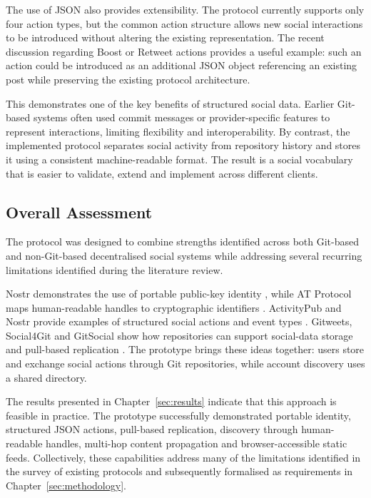 The use of JSON also provides extensibility. The protocol currently
supports only four action types, but the common action structure allows
new social interactions to be introduced without altering the existing
representation. The recent discussion regarding Boost or Retweet actions
provides a useful example: such an action could be introduced as an
additional JSON object referencing an existing post while preserving the
existing protocol architecture.

This demonstrates one of the key benefits of structured social data.
Earlier Git-based systems often used commit messages or
provider-specific features to represent interactions, limiting
flexibility and interoperability. By contrast, the implemented protocol
separates social activity from repository history and stores it using a
consistent machine-readable format. The result is a social vocabulary
that is easier to validate, extend and implement across different
clients.

\subsection{Overall Assessment}

The protocol was designed to combine strengths identified across both
Git-based and non-Git-based decentralised social systems while
addressing several recurring limitations identified during the
literature review.

Nostr demonstrates the use of portable public-key identity
\cite{fiatjaf2026}, while AT Protocol maps human-readable handles to
cryptographic identifiers \cite{atproto2026}. ActivityPub and Nostr
provide examples of structured social actions and event types
\cite{w3cActivityPub2018,fiatjaf2026}. Gitweets, Social4Git and GitSocial
show how repositories can support social-data storage and pull-based
replication \cite{gitweets2026,social4git2026,gitsocial2026}. The prototype
brings these ideas together: users store and exchange social actions
through Git repositories, while account discovery uses a shared directory.

The results presented in Chapter~\ref{sec:results} indicate that this
approach is feasible in practice. The prototype successfully
demonstrated portable identity, structured JSON actions, pull-based
replication, discovery through human-readable handles, multi-hop
content propagation and browser-accessible static feeds. Collectively,
these capabilities address many of the limitations identified in the
survey of existing protocols and subsequently formalised as requirements
in Chapter~\ref{sec:methodology}.

